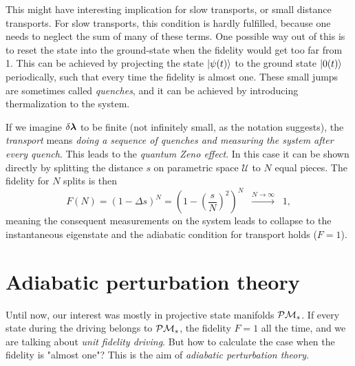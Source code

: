 This might have interesting implication for slow transports, or small distance transports. For slow transports, this condition is hardly fulfilled, because one needs to neglect the sum of many of these terms. One possible way out of this is to reset the state into the ground-state when the fidelity would get too far from 1. This can be achieved by projecting the state $\ket{\psi(t)}$ to the ground state $\ket{0(t)}$ periodically, such that every time the fidelity is almost one. These small jumps are sometimes called \emph{quenches}, and it can be achieved by introducing thermalization to the system.






If we imagine $\delta{\bm\lambda}$ to be finite (not infinitely small, as the notation suggests), the \emph{transport} means \emph{doing a sequence of quenches and measuring the system after every quench}. This leads to the \emph{quantum Zeno effect}. In this case it can be shown directly by splitting the distance $s$ on parametric space $\mathcal U$ to $N$ equal pieces. The fidelity for $N$ splits is then
\begin{equation}
    F(N)=(1-\Delta s)^N=\left(1-\left(\frac{s}{N}\right)^2\right)^N \;\;\overset{N\rightarrow\infty}{\longrightarrow}\;\; 1,
\end{equation}
meaning the consequent measurements on the system leads to collapse to the instantaneous eigenstate and the adiabatic condition for transport holds ($F=1$). 













\section{Adiabatic perturbation theory}
Until now, our interest was mostly in projective state manifolds $\mathcal{P}\mathcal{M}_s$. If every state during the driving belongs to $\mathcal{P}\mathcal{M}_s$, the fidelity $F=1$ all the time, and we are talking about \emph{unit fidelity driving}. But how to calculate the case when the fidelity is "almost one"? This is the aim of \emph{adiabatic perturbation theory}.


